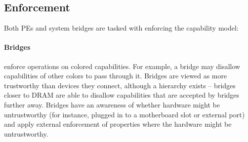 

\subsection{Enforcement}
Both PEs and system bridges are tasked with enforcing the capability model:

\paragraph{Bridges} enforce operations on colored capabilities.  For example, a bridge may disallow capabilities of other colors to pass through it.  Bridges are viewed as more trustworthy than devices they connect, although a hierarchy exists -- bridges closer to DRAM are able to disallow capabilities that are accepted by bridges further away.  Bridges have an awareness of whether hardware might be untrustworthy (for instance, plugged in to a motherboard slot or external port) and apply external enforcement of properties where the hardware might be untrustworthy.

